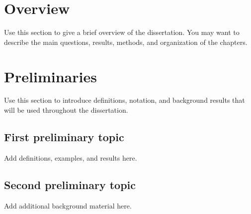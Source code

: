 \section{Overview}

Use this section to give a brief overview of the dissertation. You may want to describe the main questions, results, methods, and organization of the chapters.

\section{Preliminaries}

Use this section to introduce definitions, notation, and background results that will be used throughout the dissertation.

\subsection{First preliminary topic}

Add definitions, examples, and results here.

\subsection{Second preliminary topic}

Add additional background material here.



